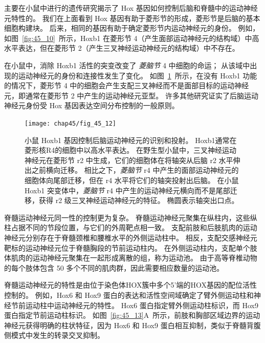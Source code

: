 主要在小鼠中进行的遗传研究揭示了 Hox 基因如何控制后脑和脊髓中的运动神经元特性的。
我们在上面看到 Hox 基因有助于菱形节的形成，菱形节是后脑的基本细胞构建块。
后来，相同的基因有助于确定菱形节内运动神经元的身份。
例如，如图~\ref{fig:45_10}~所示，Hoxb1 在菱形节 4（产生面部运动神经元的结构域）中高水平表达，但在菱形节 2（产生三叉神经运动神经元的结构域）中不存在。


在小鼠中，消除 Hoxb1 活性的突变改变了 \textit{菱脑节} 4 中细胞的命运；
从该域中出现的运动神经元的身份和连接性发生了变化。 
如图~\ref{fig:45_12}~所示，在没有 Hoxb1 功能的情况下，菱形节 4 中的细胞会产生支配三叉神经而不是面部目标的运动神经元，即通常在菱形节 2 中产生的运动神经元亚型。
许多其他研究证实了后脑运动神经元身份受 Hox 基因表达空间分布控制的一般原则。


\begin{figure}[htbp]
	\centering
	\texttt{[image: chap45/fig\_45\_12]}
	\caption{小鼠 Hoxb1 基因控制后脑运动神经元的识别和投射。
		Hoxb1通常在菱形核R4的细胞中以高水平表达。
		在野生型小鼠中，三叉神经运动神经元在菱形节 r2 中生成，它们的细胞体在将轴突从后脑 r2 水平伸出之前横向迁移。
		相比之下，\textit{菱脑节} r4 中产生的面部运动神经元的细胞体向尾部迁移，但在 r4 水平将它们的轴突投射出后脑。
		在小鼠 Hoxb1 突变体中，\textit{菱脑节} r4 中产生的运动神经元横向而不是尾部迁移，获得 r2 级三叉神经运动神经元的特征。
		椭圆表示轴突出口点\cite{studer1996altered}。}
	\label{fig:45_12}
\end{figure}


脊髓运动神经元同一性的控制更为复杂。
脊髓运动神经元聚集在纵柱内，这些纵柱占据不同的节段位置，与它们的外周靶点相一致。
支配前肢和后肢肌肉的运动神经元分别存在于脊髓颈椎和腰椎水平的外侧运动柱中。
相反，支配交感神经元靶标的运动神经元位于脊髓胸段的节前运动柱内。
在外侧运动柱内，支配单个肢体肌肉的运动神经元聚集在一起形成离散的组，称为运动池。
由于高等脊椎动物的每个肢体包含 50 多个不同的肌肉群，因此需要相应数量的运动池。


脊髓运动神经元的特性是由位于染色体HOX簇中多个5'端的HOX基因的配位活性控制的。
例如，Hox6 和 Hox9 蛋白的表达和活性空间域确定了臂外侧运动柱和神经节前运动柱中运动神经元的特性。
Hox6 蛋白指定臂外侧运动柱标识，而 Hox9 蛋白指定节前运动柱标识。
如图~\ref{fig:45_13}A~所示，前肢和胸部区域边界的运动神经元获得明确的柱状特征，因为 Hox6 和 Hox9 蛋白相互抑制，类似于脊髓背腹侧模式中发生的转录交叉抑制。


